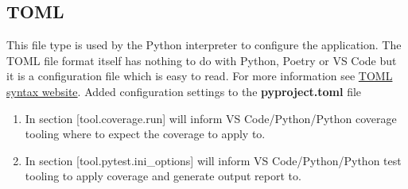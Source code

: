 \subsection{TOML}
This file type is used by the Python interpreter to configure the application.
The TOML file format itself has nothing to do with Python, Poetry or VS Code but it is a configuration file which is easy to read.
For more information see \href{https://coverage.readthedocs.io/en/latest/config.html#toml-syntax}{TOML syntax website}.
Added configuration settings to the \textbf{pyproject.toml} file

\begin{enumerate}
	\item In section [tool.coverage.run]  will inform VS Code/Python/Python coverage tooling where to expect the coverage to apply to.
	\item In section [tool.pytest.ini\_options]  will inform VS Code/Python/Python test tooling to apply coverage and generate output report to.
\end{enumerate}

